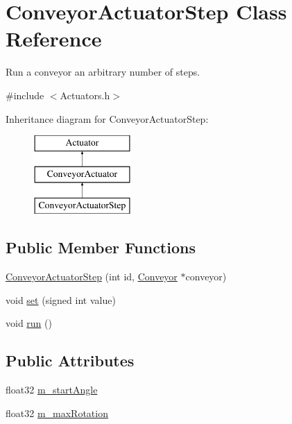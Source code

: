 \hypertarget{classConveyorActuatorStep}{\section{Conveyor\-Actuator\-Step Class Reference}
\label{classConveyorActuatorStep}
}


Run a conveyor an arbitrary number of steps.  




{\ttfamily \#include $<$Actuators.\-h$>$}

Inheritance diagram for Conveyor\-Actuator\-Step\-:\begin{figure}[H]
\begin{center}
\leavevmode
\includegraphics[height=3.000000cm]{classConveyorActuatorStep}
\end{center}
\end{figure}
\subsection*{Public Member Functions}
\begin{DoxyCompactItemize}
\item 
\hyperlink{classConveyorActuatorStep_adfdfa7103dff9ca883cfb268746fbf88}{Conveyor\-Actuator\-Step} (int id, \hyperlink{classConveyor}{Conveyor} $\ast$conveyor)
\item 
void \hyperlink{classConveyorActuatorStep_a7aa64b6b41c86fe4efac32f0090f60f9}{set} (signed int value)
\item 
void \hyperlink{classConveyorActuatorStep_a07d92edbe704485cadea21988d263201}{run} ()
\end{DoxyCompactItemize}
\subsection*{Public Attributes}
\begin{DoxyCompactItemize}
\item 
float32 \hyperlink{classConveyorActuatorStep_abb724c62bd72162123dff985ae961ce1}{m\-\_\-start\-Angle}
\item 
float32 \hyperlink{classConveyorActuatorStep_abe8e93d72ff0637b80583cb8c4a7ea24}{m\-\_\-max\-Rotation}
\end{DoxyCompactItemize}


